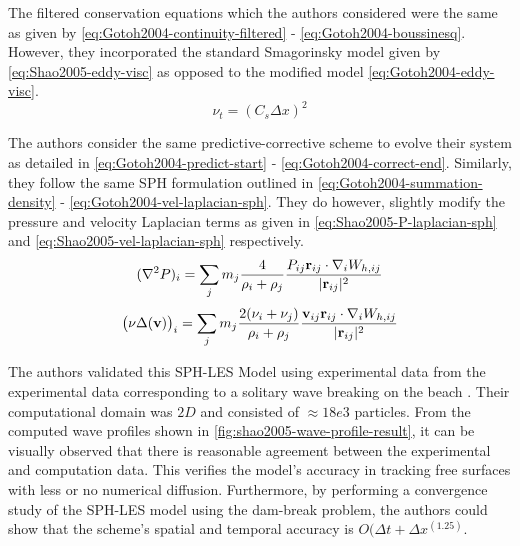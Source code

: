 The filtered conservation equations which the authors considered were the same as given by \ref{eq:Gotoh2004-continuity-filtered} - \ref{eq:Gotoh2004-boussinesq}. However, they incorporated the standard Smagorinsky model \parencite{smagorinsky1963general} given by \ref{eq:Shao2005-eddy-visc} as opposed to the modified model \ref{eq:Gotoh2004-eddy-visc}.
\begin{equation}
	\nu_t = (C_s \Delta x)^2
	\label{eq:Shao2005-eddy-visc}
\end{equation}

The authors consider the same predictive-corrective scheme to evolve their system as detailed in \ref{eq:Gotoh2004-predict-start} - \ref{eq:Gotoh2004-correct-end}.
Similarly, they follow the same SPH formulation outlined in \ref{eq:Gotoh2004-summation-density} - \ref{eq:Gotoh2004-vel-laplacian-sph}. They do however, slightly modify the pressure and velocity Laplacian terms as given in \ref{eq:Shao2005-P-laplacian-sph} and \ref{eq:Shao2005-vel-laplacian-sph} respectively.
\begin{equation}
	(\nabla^2 P)_i = \sum_j m_j \frac{4}{\rho_i + \rho_j} \frac{P_{ij} \mathbf{r}_{ij} \cdot \nabla_{i} W_{h, ij} }{|\mathbf{r}_{ij}|^{2}}
	\label{eq:Shao2005-P-laplacian-sph}
\end{equation}
\begin{equation}
	\big(\nu \Delta(\mathbf{v}) \big)_i = \sum_j m_j \frac{2(\nu_i + \nu_j)}{\rho_i + \rho_j}\frac{\mathbf{v}_{ij} \mathbf{r}_{ij} \cdot \nabla_{i} W_{h, ij}}{|\mathbf{r}_{ij}|^{2}}
	\label{eq:Shao2005-vel-laplacian-sph}
\end{equation}

The authors validated this SPH-LES Model using experimental data from the experimental data corresponding to a solitary wave breaking on the beach \parencite{Synolakis1986}. Their computational domain was $2D$ and consisted of $\approx 18e3$ particles. 
From the computed wave profiles shown in \ref{fig:shao2005-wave-profile-result}, it can be visually observed that there is reasonable agreement between the experimental and computation data. This verifies the model's accuracy in tracking free surfaces with less or no numerical diffusion.
Furthermore, by performing a convergence study of the SPH-LES model using the dam-break problem, the authors could show that the scheme's spatial and temporal accuracy is $O(\Delta t + \Delta x^(1.25)$.

